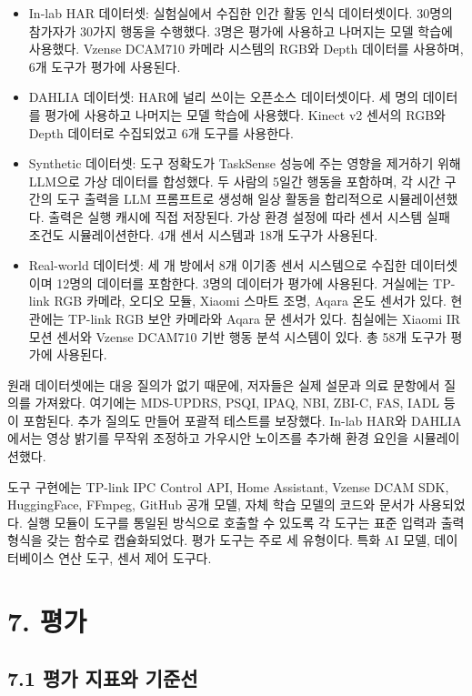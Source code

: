\documentclass[sigconf,nonacm]{acmart}
\begin{document}
\begin{itemize}
\item In-lab HAR 데이터셋: 실험실에서 수집한 인간 활동 인식 데이터셋이다. 30명의 참가자가 30가지 행동을 수행했다. 3명은 평가에 사용하고 나머지는 모델 학습에 사용했다. Vzense DCAM710 카메라 시스템의 RGB와 Depth 데이터를 사용하며, 6개 도구가 평가에 사용된다.
\item DAHLIA 데이터셋: HAR에 널리 쓰이는 오픈소스 데이터셋이다. 세 명의 데이터를 평가에 사용하고 나머지는 모델 학습에 사용했다. Kinect v2 센서의 RGB와 Depth 데이터로 수집되었고 6개 도구를 사용한다.
\item Synthetic 데이터셋: 도구 정확도가 TaskSense 성능에 주는 영향을 제거하기 위해 LLM으로 가상 데이터를 합성했다. 두 사람의 5일간 행동을 포함하며, 각 시간 구간의 도구 출력을 LLM 프롬프트로 생성해 일상 활동을 합리적으로 시뮬레이션했다. 출력은 실행 캐시에 직접 저장된다. 가상 환경 설정에 따라 센서 시스템 실패 조건도 시뮬레이션한다. 4개 센서 시스템과 18개 도구가 사용된다.
\item Real-world 데이터셋: 세 개 방에서 8개 이기종 센서 시스템으로 수집한 데이터셋이며 12명의 데이터를 포함한다. 3명의 데이터가 평가에 사용된다. 거실에는 TP-link RGB 카메라, 오디오 모듈, Xiaomi 스마트 조명, Aqara 온도 센서가 있다. 현관에는 TP-link RGB 보안 카메라와 Aqara 문 센서가 있다. 침실에는 Xiaomi IR 모션 센서와 Vzense DCAM710 기반 행동 분석 시스템이 있다. 총 58개 도구가 평가에 사용된다.
\end{itemize}


원래 데이터셋에는 대응 질의가 없기 때문에, 저자들은 실제 설문과 의료 문항에서 질의를 가져왔다. 여기에는 MDS-UPDRS, PSQI, IPAQ, NBI, ZBI-C, FAS, IADL 등이 포함된다. 추가 질의도 만들어 포괄적 테스트를 보장했다. In-lab HAR와 DAHLIA에서는 영상 밝기를 무작위 조정하고 가우시안 노이즈를 추가해 환경 요인을 시뮬레이션했다.

도구 구현에는 TP-link IPC Control API, Home Assistant, Vzense DCAM SDK, HuggingFace, FFmpeg, GitHub 공개 모델, 자체 학습 모델의 코드와 문서가 사용되었다. 실행 모듈이 도구를 통일된 방식으로 호출할 수 있도록 각 도구는 표준 입력과 출력 형식을 갖는 함수로 캡슐화되었다. 평가 도구는 주로 세 유형이다. 특화 AI 모델, 데이터베이스 연산 도구, 센서 제어 도구다.

\section{7. 평가}

\subsection{7.1 평가 지표와 기준선}
\end{document}
